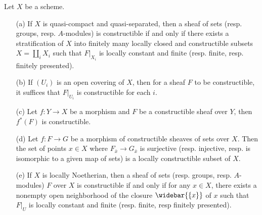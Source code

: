 \begin{proposition}\label{scheme etale constructible sheaf prop}
Let $X$ be a scheme.
\begin{enumerate}
    \item[(a)] If $X$ is quasi-compact and quasi-separated, then a sheaf of sets (resp. groups, resp. $A$-modules) is constructible if and only if there exists a stratification of $X$ into finitely many locally closed and constructible subsets $X=\coprod_iX_i$ such that $F|_{X_i}$ is locally constant and finite (resp. finite, resp. finitely presented).
    \item[(b)] If $(U_i)$ is an open covering of $X$, then for a sheaf $F$ to be constructible, it suffices that $F|_{U_i}$ is constructible for each $i$.
    \item[(c)] Let $f:Y\to X$ be a morphism and $F$ be a constructible sheaf over $Y$, then $f^*(F)$ is constructible.
    \item[(d)] Let $f:F\to G$ be a morphism of constructible sheaves of sets over $X$. Then the set of points $x\in X$ where $F_{\bar{x}}\to G_{\bar{x}}$ is surjective (resp. injective, resp. is isomorphic to a given map of sets) is a locally constructible subset of $X$.
    \item[(e)] If $X$ is locally Noetherian, then a sheaf of sets (resp. groups, resp. $A$-modules) $F$ over $X$ is constructible if and only if for any $x\in X$, there exists a nonempty open neighborhood of the closure $\widebar{\{x\}}$ of $x$ such that $F|_U$ is locally constant and finite (resp. finite, resp finitely presented).
\end{enumerate}
\end{proposition}
